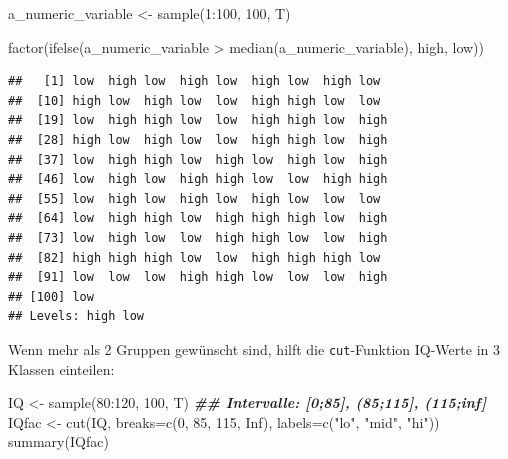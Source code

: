 \documentclass[
]{book}
\newenvironment{Shaded}{\begin{snugshade}}{\end{snugshade}}
\newcommand{\AttributeTok}[1]{\textcolor[rgb]{0.77,0.63,0.00}{#1}}
\newcommand{\ConstantTok}[1]{\textcolor[rgb]{0.00,0.00,0.00}{#1}}
\newcommand{\DecValTok}[1]{\textcolor[rgb]{0.00,0.00,0.81}{#1}}
\newcommand{\DocumentationTok}[1]{\textcolor[rgb]{0.56,0.35,0.01}{\textbf{\textit{#1}}}}
\newcommand{\FunctionTok}[1]{\textcolor[rgb]{0.00,0.00,0.00}{#1}}
\newcommand{\NormalTok}[1]{#1}
\newcommand{\OtherTok}[1]{\textcolor[rgb]{0.56,0.35,0.01}{#1}}
\newcommand{\SpecialCharTok}[1]{\textcolor[rgb]{0.00,0.00,0.00}{#1}}
\newcommand{\StringTok}[1]{\textcolor[rgb]{0.31,0.60,0.02}{#1}}
\begin{document}
\begin{Shaded}
\begin{Highlighting}[]
\NormalTok{a\_numeric\_variable }\OtherTok{\textless{}{-}} \FunctionTok{sample}\NormalTok{(}\DecValTok{1}\SpecialCharTok{:}\DecValTok{100}\NormalTok{, }\DecValTok{100}\NormalTok{, T)}


\FunctionTok{factor}\NormalTok{(}\FunctionTok{ifelse}\NormalTok{(a\_numeric\_variable }\SpecialCharTok{\textgreater{}} \FunctionTok{median}\NormalTok{(a\_numeric\_variable),}
              \StringTok{\textquotesingle{}high\textquotesingle{}}\NormalTok{,}
              \StringTok{\textquotesingle{}low\textquotesingle{}}\NormalTok{))}
\end{Highlighting}
\end{Shaded}

\begin{verbatim}
##   [1] low  high low  high low  high low  high low 
##  [10] high low  high low  low  high high low  low 
##  [19] low  high high low  low  high high low  high
##  [28] high low  high low  low  high high low  high
##  [37] low  high high low  high low  high low  high
##  [46] low  high low  high high low  low  high high
##  [55] low  high low  high low  high low  low  low 
##  [64] low  high high low  high high high low  high
##  [73] low  high low  low  high high low  low  high
##  [82] high high high low  low  high high high low 
##  [91] low  low  low  high high low  low  low  high
## [100] low 
## Levels: high low
\end{verbatim}

Wenn mehr als 2 Gruppen gewünscht sind, hilft die \texttt{cut}-Funktion
IQ-Werte in 3 Klassen einteilen:

\begin{Shaded}
\begin{Highlighting}[]
\NormalTok{IQ }\OtherTok{\textless{}{-}} \FunctionTok{sample}\NormalTok{(}\DecValTok{80}\SpecialCharTok{:}\DecValTok{120}\NormalTok{, }\DecValTok{100}\NormalTok{, T)}
\DocumentationTok{\#\# Intervalle: [0;85], (85;115], (115;inf]}
\NormalTok{IQfac }\OtherTok{\textless{}{-}} \FunctionTok{cut}\NormalTok{(IQ, }\AttributeTok{breaks=}\FunctionTok{c}\NormalTok{(}\DecValTok{0}\NormalTok{, }\DecValTok{85}\NormalTok{, }\DecValTok{115}\NormalTok{, }\ConstantTok{Inf}\NormalTok{), }
             \AttributeTok{labels=}\FunctionTok{c}\NormalTok{(}\StringTok{"lo"}\NormalTok{, }\StringTok{"mid"}\NormalTok{, }\StringTok{"hi"}\NormalTok{))}
\FunctionTok{summary}\NormalTok{(IQfac)}
\end{Highlighting}
\end{Shaded}
\end{document}
